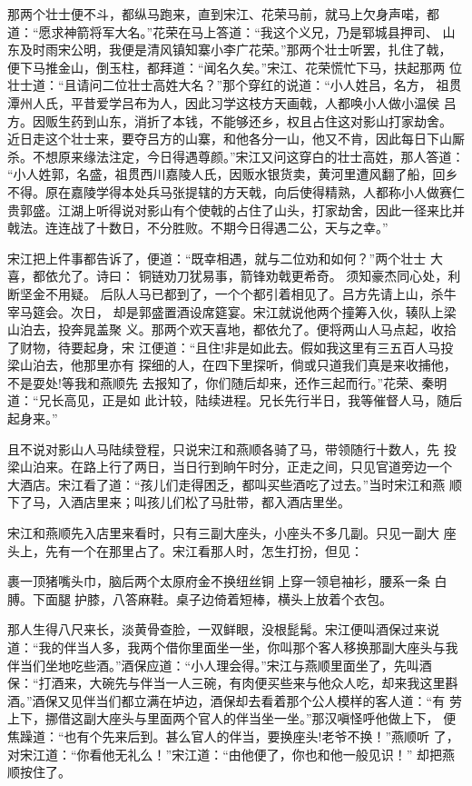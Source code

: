 那两个壮士便不斗，都纵马跑来，直到宋江、花荣马前，就马上欠身声喏，都
道：“愿求神箭将军大名。”花荣在马上答道：“我这个义兄，乃是郓城县押司、
山东及时雨宋公明，我便是清风镇知寨小李广花荣。”那两个壮士听罢，扎住了戟，
便下马推金山，倒玉柱，都拜道：“闻名久矣。”宋江、花荣慌忙下马，扶起那两
位壮士道：“且请问二位壮士高姓大名？”那个穿红的说道：“小人姓吕，名方，
祖贯潭州人氏，平昔爱学吕布为人，因此习学这枝方天画戟，人都唤小人做小温侯
吕方。因贩生药到山东，消折了本钱，不能够还乡，权且占住这对影山打家劫舍。
近日走这个壮士来，要夺吕方的山寨，和他各分一山，他又不肯，因此每日下山厮
杀。不想原来缘法注定，今日得遇尊颜。”宋江又问这穿白的壮士高姓，那人答道：
“小人姓郭，名盛，祖贯西川嘉陵人氏，因贩水银货卖，黄河里遭风翻了船，回乡
不得。原在嘉陵学得本处兵马张提辖的方天戟，向后使得精熟，人都称小人做赛仁
贵郭盛。江湖上听得说对影山有个使戟的占住了山头，打家劫舍，因此一径来比并
戟法。连连战了十数日，不分胜败。不期今日得遇二公，天与之幸。”

宋江把上件事都告诉了，便道：“既幸相遇，就与二位劝和如何？”两个壮士
大喜，都依允了。诗曰：
铜链劝刀犹易事，箭锋劝戟更希奇。
须知豪杰同心处，利断坚金不用疑。
后队人马已都到了，一个个都引着相见了。吕方先请上山，杀牛宰马筵会。次日，
却是郭盛置酒设席筵宴。宋江就说他两个撞筹入伙，辏队上梁山泊去，投奔晁盖聚
义。那两个欢天喜地，都依允了。便将两山人马点起，收拾了财物，待要起身，宋
江便道：“且住!非是如此去。假如我这里有三五百人马投梁山泊去，他那里亦有
探细的人，在四下里探听，倘或只道我们真是来收捕他，不是耍处!等我和燕顺先
去报知了，你们随后却来，还作三起而行。”花荣、秦明道：“兄长高见，正是如
此计较，陆续进程。兄长先行半日，我等催督人马，随后起身来。”

且不说对影山人马陆续登程，只说宋江和燕顺各骑了马，带领随行十数人，先
投梁山泊来。在路上行了两日，当日行到晌午时分，正走之间，只见官道旁边一个
大酒店。宋江看了道：“孩儿们走得困乏，都叫买些酒吃了过去。”当时宋江和燕
顺下了马，入酒店里来；叫孩儿们松了马肚带，都入酒店里坐。

宋江和燕顺先入店里来看时，只有三副大座头，小座头不多几副。只见一副大
座头上，先有一个在那里占了。宋江看那人时，怎生打扮，但见：

裹一顶猪嘴头巾，脑后两个太原府金不换纽丝铜上穿一领皂袖衫，腰系一条
白膊。下面腿护膝，八答麻鞋。桌子边倚着短棒，横头上放着个衣包。

那人生得八尺来长，淡黄骨查脸，一双鲜眼，没根髭髯。宋江便叫酒保过来说
道：“我的伴当人多，我两个借你里面坐一坐，你叫那个客人移换那副大座头与我
伴当们坐地吃些酒。”酒保应道：“小人理会得。”宋江与燕顺里面坐了，先叫酒
保：“打酒来，大碗先与伴当一人三碗，有肉便买些来与他众人吃，却来我这里斟
酒。”酒保又见伴当们都立满在垆边，酒保却去看着那个公人模样的客人道：“有
劳上下，挪借这副大座头与里面两个官人的伴当坐一坐。”那汉嗔怪呼他做上下，
便焦躁道：“也有个先来后到。甚么官人的伴当，要换座头!老爷不换！”燕顺听
了，对宋江道：“你看他无礼么！”宋江道：“由他便了，你也和他一般见识！”
却把燕顺按住了。

